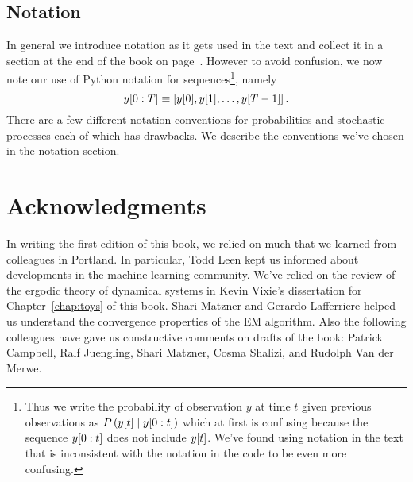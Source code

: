 \documentclass[ltxbook,showlabels, commentsvisible]{hmmdsbook}
\begin{document}

\subsection*{Notation}
\label{preface_notation}

In general we introduce notation as it gets used in the text and
collect it in a section at the end of the book on
page~\pageref{sec:notation}.  However to avoid confusion, we now note
our use of Python notation for sequences\footnote{Thus we write the
  probability of observation $y$ at time $t$ given previous
  observations as $P\left( {y}{[t]} \mid y[0:t] \right)$
  which at first is confusing because the sequence $y[0:t]$ does
  not include ${y}{[t]}$.  We've found using notation in the text
  that is inconsistent with the notation in the code to be even more
  confusing.}, namely
\begin{equation*}
  y[0:T] \equiv \left[ y[0], y[1], \ldots, y[T-1] \right].
\end{equation*}
There are a few different notation conventions for probabilities and
stochastic processes each of which has drawbacks.  We describe the
conventions we've chosen in the notation section.

\section*{Acknowledgments}
%
\label{sec:ack}
\longpage%

In writing the first edition of this book, we relied on much that we
learned from colleagues in Portland.  In particular, Todd Leen kept us
informed about developments in the machine learning community.  We've
relied on the review of the ergodic theory of dynamical systems in
Kevin Vixie's dissertation\cite{vixie02} for Chapter~\ref{chap:toys}
of this book.  Shari Matzner and Gerardo Lafferriere helped us
understand the convergence properties of the EM algorithm.  Also the
following colleagues have gave us constructive comments on drafts of
the book:
% 
Patrick Campbell, %
Ralf Juengling, %
Shari Matzner, %
Cosma Shalizi, %
and %
Rudolph Van der Merwe. %
\end{document}
